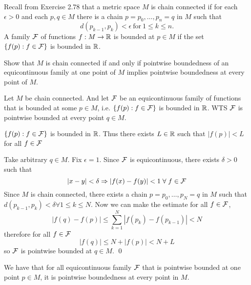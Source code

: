 \documentclass[a4paper, 12pt]{article}
\begin{document}
\begin{problem} 
Recall from Exercise 2.78 that a metric space $M$ is chain connected if for each $\epsilon > 0$ and each $p, q \in M$ there is a chain $p = p_0, \dots, p_n = q$ in $M$ such that \[
    d(p_{k-1}, p_k) < \epsilon \:\text{for}\:  1\leq k \leq n.
\]
A family $\mathcal{F}$ of functions $f: M \to \mathbb{R}$ is bounded at $p \in M$ if the set $\{f(p) : f \in \mathcal{F}\}$ is bounded in $\mathbb{R}$.

Show that $M$ is chain connected if and only if pointwise boundedness of an equicontinuous family at one point of $M$ implies pointwise boundedness at every point of $M$.
\end{problem}
\begin{solution}
    \pffwd Let $M$ be chain connected. And let $\mathcal{F}$ be an equicontinuous family of functions that is bounded at some $p \in M$, i.e. $\{f(p) : f \in \mathcal{F}\}$ is bounded in $\mathbb{R}$. WTS $\mathcal{F}$ is pointwise bounded at every point $q \in M$.

    $\{f(p) : f \in \mathcal{F}\}$ is bounded in $\mathbb{R}$. Thus there exists $L \in \mathbb{R}$ such that $|f(p)| < L$ for all $f \in \mathcal{F}$

    Take arbitrary $q \in M$. Fix $\epsilon = 1$. Since $\mathcal{F}$ is equicontinuous, there exists $\delta > 0$ such that \[
        |x- y| < \delta \implies |f(x) - f(y)| < 1 \forall f \in \calf
    \]
    Since $M$ is chain connected, there exists a chain $p = p_0, \dots, p_N = q$ in $M$ such that $d(p_{k-1}, p_k) < \delta \forall 1 \leq k \leq N$.
    Now we can make the estimate for all $f \in \mathcal{F}$,  \[
        |f(q) - f(p)| \leq \sum_{k=1}^{N}|f(p_{k}) - f(p_{k-1})| < N
    \]
    therefore for all $f \in \mathcal{F}$ \[
        |f(q)| \leq N + |f(p)| < N + L
    \]
    so $\mathcal{F}$ is pointwise bounded at $q \in M$. \qed

    \pfbwd We have that for all equicontinuous family $\mathcal{F}$ that is pointwise bounded at one point $p \in M$, it is pointwise boundedness at every point in $M$.




\end{solution}
\end{document}
